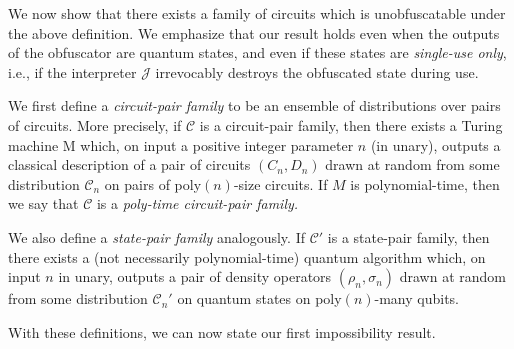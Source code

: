 \documentclass[11pt]{article}
\numberwithin{equation}{section}
\begin{document}
{We now show that there exists a family of circuits which is unobfuscatable under the above definition. We emphasize that our result holds even when the outputs of the obfuscator are quantum states, and even if these states are \emph{single-use only}, i.e., if the interpreter $\mathcal J$ irrevocably destroys the obfuscated state during use. 

We first define a \emph{circuit-pair family} to be an ensemble of distributions over pairs of circuits. More precisely, if $\mathcal C$ is a circuit-pair family, then there exists a Turing machine M which, on input a positive integer parameter $n$ (in unary), outputs a classical description of a pair of circuits $(C_n, D_n)$ drawn at random from some distribution $\mathcal C_n$ on pairs of poly$(n)$-size circuits. If $M$ is polynomial-time, then we say that $\mathcal C$ is a \emph{poly-time circuit-pair family.}

We also define a \emph{state-pair family} analogously. If $\mathcal C'$ is a state-pair family, then there exists a (not necessarily polynomial-time) quantum algorithm which, on input $n$ in unary, outputs a pair of density operators $(\rho_n, \sigma_n)$ drawn at random from some distribution $\mathcal C_n'$ on quantum states on poly$(n)$-many qubits. 

With these definitions, we can now state our first impossibility result.

}
\end{document}
